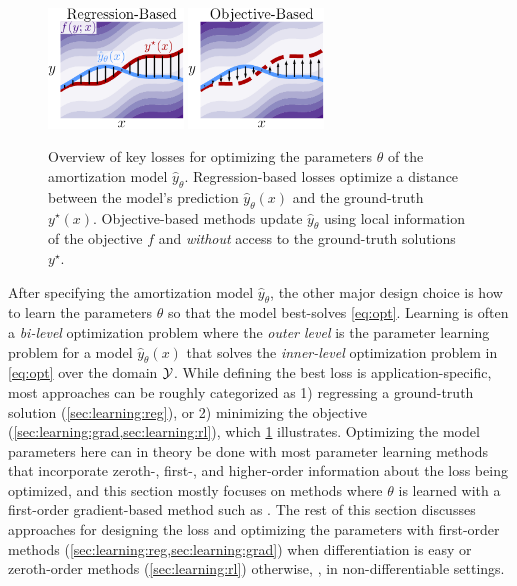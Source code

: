 \begin{figure}[t]
  \centering
  \includegraphics[width=0.32\textwidth]{fig/learning-reg.pdf}
  \hspace{10mm}
  \includegraphics[width=0.32\textwidth]{fig/learning-obj.pdf}
  \caption{Overview of key losses for optimizing
    the parameters $\theta$ of the amortization model $\hat y_\theta$.
    Regression-based losses optimize a distance between
    the model's prediction $\hat y_\theta(x)$ and the
    ground-truth $y^\star(x)$. Objective-based
    methods update $\hat y_\theta$ using
    local information of the objective $f$
    and \emph{without} access to the ground-truth
    solutions $y^\star$.
  }
  \label{fig:learning}
\end{figure}

After specifying the amortization model $\hat y_\theta$, the other major
design choice is how to learn the parameters $\theta$
so that the model best-solves \cref{eq:opt}.
Learning is often a \emph{bi-level} optimization problem
where the \emph{outer level} is the parameter
learning problem for a model $\hat y_\theta(x)$ that solves
the \emph{inner-level} optimization problem in \cref{eq:opt}
over the domain ${\mathcal{Y}}$.
While defining the best loss is application-specific,
most approaches can be roughly categorized as
1) regressing a ground-truth solution (\cref{sec:learning:reg}),
or 2) minimizing the objective (\cref{sec:learning:grad,sec:learning:rl}),
which \cref{fig:learning} illustrates.
Optimizing the model parameters here can in theory be done
with most parameter learning methods that incorporate
zeroth-, first-, and higher-order information
about the loss being optimized, and this section mostly focuses
on methods where $\theta$ is learned with a
first-order gradient-based method
such as \citet{nesterov1983method,duchi2011adaptive,zeiler2012adadelta,kingma2014adam}.
The rest of this section discusses approaches for
designing the loss and optimizing the parameters
with first-order methods
(\cref{sec:learning:reg,sec:learning:grad})
when differentiation is easy
or zeroth-order methods (\cref{sec:learning:rl})
otherwise, \eg, in non-differentiable settings.

